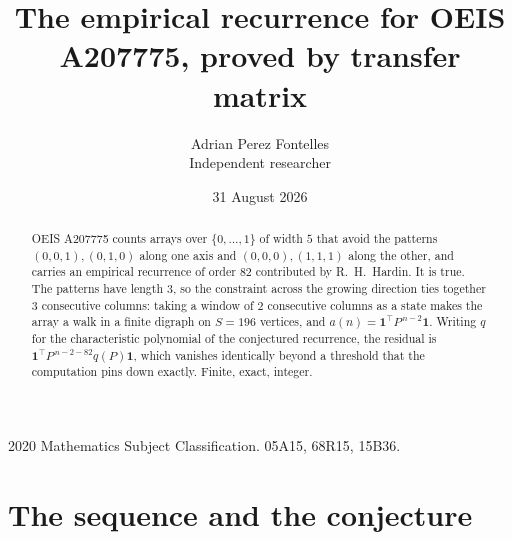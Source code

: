 \documentclass[11pt,a4paper]{article}
\title{The empirical recurrence for OEIS A207775, proved by transfer matrix}
\author{Adrian Perez Fontelles\\ \small Independent researcher}
\date{31 August 2026}
\theoremstyle{plain}
\theoremstyle{definition}
\begin{document}
\maketitle

\begin{abstract}
OEIS A207775 counts arrays over $\{0,\dots,1\}$ of width $5$ that avoid the patterns
$(0,0,1), (0,1,0)$ along one axis and $(0,0,0), (1,1,1)$ along the other, and carries an empirical recurrence of
order $82$ contributed by R.~H.~Hardin. It is true. The patterns have length $3$, so
the constraint across the growing direction ties together $3$ consecutive columns: taking a
window of $2$ consecutive columns as a state makes the array a walk in a finite digraph
on $S=196$ vertices, and $a(n)=\mathbf{1}^{\!\top}P^{\,n-2}\mathbf{1}$. Writing $q$
for the characteristic polynomial of the conjectured recurrence, the residual is
$\mathbf{1}^{\!\top}P^{\,n-2-82}q(P)\mathbf{1}$, which vanishes identically
beyond a threshold that the computation pins down exactly. Finite, exact, integer.
\end{abstract}

\noindent\small 2020 Mathematics Subject Classification. 05A15, 68R15, 15B36.\normalsize

\section{The sequence and the conjecture}
\end{document}
